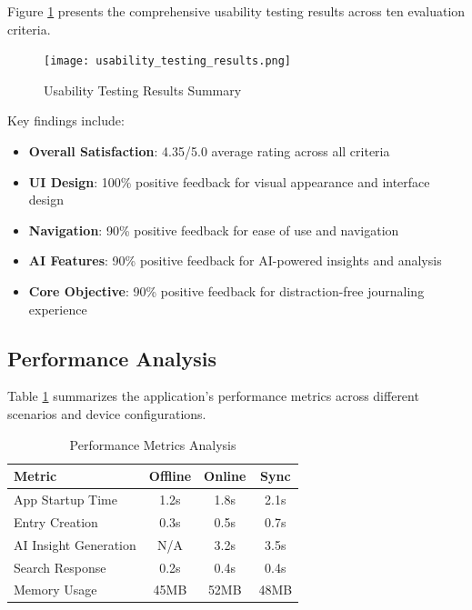 \documentclass[conference]{IEEEtran}
\begin{document}
Figure \ref{fig:usability_results} presents the comprehensive usability testing results across ten evaluation criteria.

\begin{figure}[htbp]
\centerline{\texttt{[image: usability\_testing\_results.png]}}
\caption{Usability Testing Results Summary}
\label{fig:usability_results}
\end{figure}

Key findings include:
\begin{itemize}
\item \textbf{Overall Satisfaction}: 4.35/5.0 average rating across all criteria
\item \textbf{UI Design}: 100\% positive feedback for visual appearance and interface design
\item \textbf{Navigation}: 90\% positive feedback for ease of use and navigation
\item \textbf{AI Features}: 90\% positive feedback for AI-powered insights and analysis
\item \textbf{Core Objective}: 90\% positive feedback for distraction-free journaling experience
\end{itemize}

\subsection{Performance Analysis}

Table \ref{table:performance_metrics} summarizes the application's performance metrics across different scenarios and device configurations.

\begin{table}[htbp]
\caption{Performance Metrics Analysis}
\begin{center}
\begin{tabular}{|l|c|c|c|}
\hline
\textbf{Metric} & \textbf{Offline} & \textbf{Online} & \textbf{Sync} \\
\hline
App Startup Time & 1.2s & 1.8s & 2.1s \\
Entry Creation & 0.3s & 0.5s & 0.7s \\
AI Insight Generation & N/A & 3.2s & 3.5s \\
Search Response & 0.2s & 0.4s & 0.4s \\
Memory Usage & 45MB & 52MB & 48MB \\
\hline
\end{tabular}
\label{table:performance_metrics}
\end{center}
\end{table}
\end{document}
